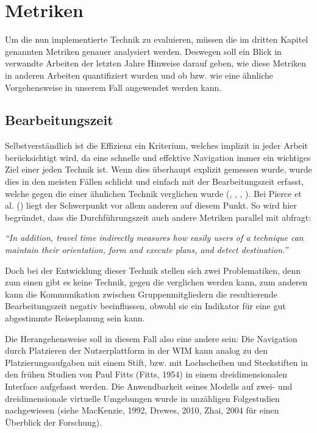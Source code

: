 \section{Metriken}
Um die nun implementierte Technik zu evaluieren, müssen die im dritten Kapitel genannten Metriken genauer analysiert werden. Deswegen soll ein Blick in verwandte Arbeiten der letzten Jahre Hinweise darauf geben, wie diese Metriken in anderen Arbeiten quantifiziert wurden und ob bzw. wie eine ähnliche Vorgehensweise in unserem Fall angewendet werden kann.

\subsection{Bearbeitungszeit}
Selbstverständlich ist die Effizienz ein Kriterium, welches implizit in jeder Arbeit berücksichtigt wird, da eine schnelle und effektive Navigation immer ein wichtiges Ziel einer jeden Technik ist. Wenn dies überhaupt explizit gemessen wurde, wurde dies in den meisten Fällen schlicht und einfach mit der Bearbeitungszeit erfasst, welche gegen die einer ähnlichen Technik verglichen wurde (\cite{Suma2010EvaluationEnvironments}, \cite{Kopper2006DesignEnvironments}, \cite{3_Pierce1997}, \cite{Wingrave2006OvercomingWIM}). 
Bei Pierce et al. (\cite{3_Pierce1997}) liegt der Schwerpunkt vor allem anderen auf diesem Punkt. So wird hier begründet, dass die Durchführungszeit auch andere Metriken parallel mit abfragt:

\begin{addmargin}[25pt]{0pt} 

\textit{“In addition, travel time indirectly measures how easily users of a technique can maintain their orientation, form and execute plans, and detect destination.”}

\end{addmargin}

Doch bei der Entwicklung dieser Technik stellen sich zwei Problematiken, denn zum einen gibt es keine Technik, gegen die verglichen werden kann, zum anderen kann die Kommunikation zwischen Gruppenmitgliedern die resultierende Bearbeitungszeit negativ beeinflussen, obwohl sie ein Indikator für eine gut abgestimmte Reiseplanung sein kann.

Die Herangehensweise soll in diesem Fall also eine andere sein:
Die Navigation durch Platzieren der Nutzerplattform in der WIM kann analog zu den Platzierungsaufgaben mit einem Stift, bzw. mit Lochscheiben und Steckstiften in den frühen Studien von Paul Fitts (Fitts, 1954) in einem dreidimensionalen Interface aufgefasst werden. Die Anwendbarkeit seines Modells auf zwei- und dreidimensionale virtuelle Umgebungen wurde in unzähligen Folgestudien nachgewiesen (siehe MacKenzie, 1992, Drewes, 2010, Zhai, 2004 für einen Überblick der Forschung).

